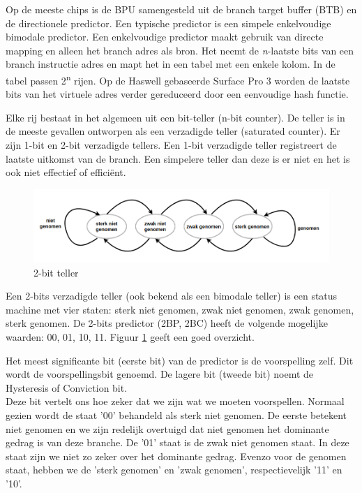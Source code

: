 Op de meeste chips is de BPU samengesteld uit de branch target buffer (BTB) en de directionele predictor.
Een typische predictor is een simpele enkelvoudige bimodale predictor.
Een enkelvoudige predictor maakt gebruik van directe mapping en alleen het branch adres als bron.
Het neemt de \emph{n}-laatste bits van een branch instructie adres en mapt het in een tabel met een enkele kolom. In de tabel passen 2\textsuperscript{n} rijen.
Op de Haswell gebaseerde Surface Pro 3 worden de laatste bits van het virtuele adres
verder gereduceerd door een eenvoudige hash
functie.

Elke rij bestaat in het algemeen uit een bit-teller (n-bit counter).
De teller is in de meeste gevallen ontworpen als een verzadigde teller (saturated counter).
Er zijn 1-bit en 2-bit verzadigde tellers.
Een 1-bit verzadigde teller registreert de laatste uitkomst van de branch.
Een simpelere teller dan deze is er niet en het is ook niet effectief of efficiënt.


\begin{figure}
	\includegraphics[width=1.0\linewidth]{img/predictor.png}
	\caption{2-bit teller}
	\label{fig:predictor}
\end{figure}

Een 2-bits verzadigde teller (ook bekend als een bimodale teller) is een status machine met vier staten: sterk niet genomen, zwak niet genomen, zwak genomen, sterk genomen. \parencite{Lee2017}
De 2-bits predictor (2BP, 2BC) heeft de volgende mogelijke waarden: 00, 01, 10, 11. Figuur \ref{fig:predictor} geeft een goed overzicht.

Het meest significante bit (eerste bit) van de predictor is de voorspelling zelf.
Dit wordt de voorspellingsbit genoemd.
De lagere bit (tweede bit) noemt de Hysteresis of Conviction bit.\\
Deze bit vertelt ons hoe zeker dat we zijn wat we moeten voorspellen.
Normaal gezien wordt de staat '00' behandeld als sterk niet genomen.
De eerste betekent niet genomen en we zijn redelijk overtuigd dat niet genomen het dominante gedrag is van deze branche.
De '01' staat is de zwak niet genomen staat. In deze staat zijn we niet zo zeker over het dominante gedrag.
Evenzo voor de genomen staat, hebben we de 'sterk genomen' en 'zwak genomen', respectievelijk '11' en '10'.




